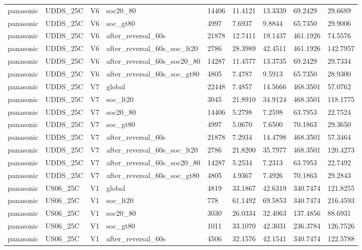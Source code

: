 \begin{tabular}{lllllllll}
panasonic & UDDS\_25C & V6 & soc20\_80 & 14406 & 11.4121 & 13.3339 & 69.2429 & 29.6689 \\
panasonic & UDDS\_25C & V6 & soc\_gt80 & 4997 & 7.6937 & 9.8844 & 65.7350 & 29.9006 \\
panasonic & UDDS\_25C & V6 & after\_reversal\_60s & 21878 & 12.7411 & 19.1437 & 461.1926 & 74.5576 \\
panasonic & UDDS\_25C & V6 & after\_reversal\_60s\_soc\_lt20 & 2786 & 28.3989 & 42.4511 & 461.1926 & 142.7957 \\
panasonic & UDDS\_25C & V6 & after\_reversal\_60s\_soc20\_80 & 14287 & 11.4577 & 13.3735 & 69.2429 & 29.7334 \\
panasonic & UDDS\_25C & V6 & after\_reversal\_60s\_soc\_gt80 & 4805 & 7.4787 & 9.5913 & 65.7350 & 28.9300 \\
panasonic & UDDS\_25C & V7 & global & 22448 & 7.4857 & 14.5666 & 468.3501 & 57.0762 \\
panasonic & UDDS\_25C & V7 & soc\_lt20 & 3045 & 21.8910 & 34.9124 & 468.3501 & 118.1775 \\
panasonic & UDDS\_25C & V7 & soc20\_80 & 14406 & 5.2798 & 7.2598 & 63.7953 & 22.7524 \\
panasonic & UDDS\_25C & V7 & soc\_gt80 & 4997 & 5.0670 & 7.6500 & 70.1863 & 29.3650 \\
panasonic & UDDS\_25C & V7 & after\_reversal\_60s & 21878 & 7.2934 & 14.4798 & 468.3501 & 57.3464 \\
panasonic & UDDS\_25C & V7 & after\_reversal\_60s\_soc\_lt20 & 2786 & 21.8200 & 35.7977 & 468.3501 & 120.4273 \\
panasonic & UDDS\_25C & V7 & after\_reversal\_60s\_soc20\_80 & 14287 & 5.2534 & 7.2313 & 63.7953 & 22.7492 \\
panasonic & UDDS\_25C & V7 & after\_reversal\_60s\_soc\_gt80 & 4805 & 4.9367 & 7.4926 & 70.1863 & 29.2843 \\
panasonic & US06\_25C & V1 & global & 4819 & 33.1867 & 42.6319 & 340.7474 & 121.8255 \\
panasonic & US06\_25C & V1 & soc\_lt20 & 778 & 61.1492 & 69.5853 & 340.7474 & 216.4593 \\
panasonic & US06\_25C & V1 & soc20\_80 & 3030 & 26.0334 & 32.4063 & 137.4856 & 88.6931 \\
panasonic & US06\_25C & V1 & soc\_gt80 & 1011 & 33.1070 & 42.3031 & 236.3784 & 126.7526 \\
panasonic & US06\_25C & V1 & after\_reversal\_60s & 4506 & 32.1576 & 42.1541 & 340.7474 & 122.5788 \\

\end{tabular}
